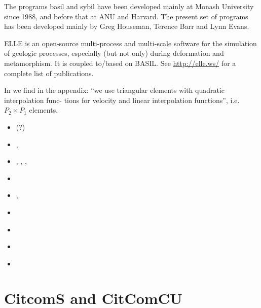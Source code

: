 The programs basil and sybil have been developed  mainly  at Monash  University  since  1988,  
and before that at ANU and Harvard.  The present set of  programs  has  been  developed mainly  by  
Greg  Houseman, Terence  Barr  and  Lynn Evans.

ELLE is an open-source multi-process and multi-scale software for the simulation of geologic processes, 
especially (but not only) during deformation and metamorphism. It is coupled to/based on BASIL. 
See \url{http://elle.ws/} for a complete list of publications.

In \textcite{baho96} we find in the appendix: ``we use triangular elements with quadratic interpolation func-
tions for velocity and linear interpolation functions'', i.e. $P_2 \times P_1$ elements.

\begin{small}
\begin{itemize}
\item[\nineteenninetytwo]     \textcite{baho92}(?)
\item[\nineteenninetysix]     \textcite{baho96},  \textcite{hoen96}
\item[\nineteenninetyseven]   \textcite{hogu97},  \textcite{homo97},
                              \textcite{bobt97},  \textcite{neho97}
\item[\twothousand]           \textcite{honk00}
\item[\twothousandone]        \textcite{tesb01},  \textcite{jebe01}
\item[\twothousandeight]      \textcite{bokj08}
\item[\twothousandseventeen]  \textcite{waeh17}
\item[\twothousandnineteen]   \textcite{llor19}
\item[\twothousandtwentyfive] \textcite{hoee25}
\end{itemize}
\end{small}



\section{CitcomS and CitComCU} 

